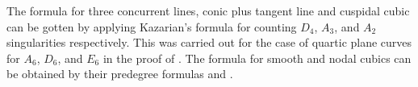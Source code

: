 \documentclass[12 pt, reqno]{amsart}
\theoremstyle{definition}
\begin{document}
The formula for three concurrent lines, conic plus tangent line and
cuspidal cubic can be gotten by applying Kazarian's formula
\cite[Theorem 1]{Kazarian} for counting $D_4$, $A_3$, and $A_2$
singularities respectively. This was carried out for the case of
quartic plane curves for $A_6$, $D_6$, and $E_6$ in the proof of
. The formula for smooth and nodal cubics can be
obtained by their predegree formulas \cite[Section 3.6]{AF93} and
.



\end{document}
